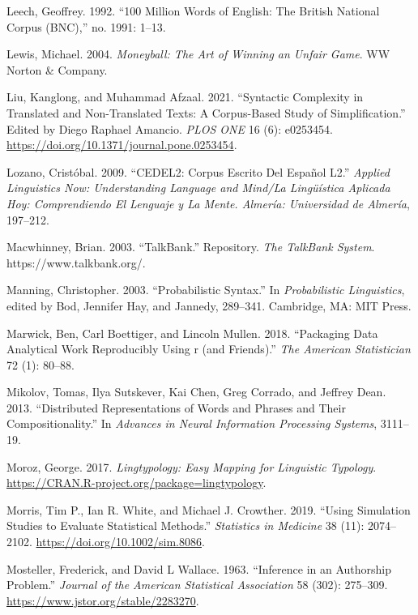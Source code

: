 \documentclass[
  letterpaper,
]{latex/krantz}
\newlength{\cslhangindent}
\newenvironment{CSLReferences}[2] %
 {\begin{list}{}{%
  \setlength{\itemindent}{0pt}
  \setlength{\leftmargin}{0pt}
  \setlength{\parsep}{0pt}
  \ifodd #1
   \setlength{\leftmargin}{\cslhangindent}
   \setlength{\itemindent}{-1\cslhangindent}
  \fi
  \setlength{\itemsep}{#2\baselineskip}}}
 {\end{list}}
\theoremstyle{definition}
\theoremstyle{remark}
\begin{document}
\begin{CSLReferences}{1}{0}
Leech, Geoffrey. 1992. {``100 Million Words of English: The British
National Corpus (BNC),''} no. 1991: 1--13.

Lewis, Michael. 2004. \emph{Moneyball: The Art of Winning an Unfair
Game}. WW Norton \& Company.

Liu, Kanglong, and Muhammad Afzaal. 2021. {``Syntactic Complexity in
Translated and Non-Translated Texts: A Corpus-Based Study of
Simplification.''} Edited by Diego Raphael Amancio. \emph{PLOS ONE} 16
(6): e0253454. \url{https://doi.org/10.1371/journal.pone.0253454}.

Lozano, Cristóbal. 2009. {``CEDEL2: Corpus Escrito Del Espa{ñ}ol L2.''}
\emph{Applied Linguistics Now: Understanding Language and Mind/La
Ling{ü}{í}stica Aplicada Hoy: Comprendiendo El Lenguaje y La Mente.
Almer{í}a: Universidad de Almer{í}a}, 197--212.

Macwhinney, Brian. 2003. {``TalkBank.''} Repository. \emph{The TalkBank
System}. https://www.talkbank.org/.

Manning, Christopher. 2003. {``Probabilistic Syntax.''} In
\emph{Probabilistic Linguistics}, edited by Bod, Jennifer Hay, and
Jannedy, 289--341. Cambridge, MA: MIT Press.

Marwick, Ben, Carl Boettiger, and Lincoln Mullen. 2018. {``Packaging
Data Analytical Work Reproducibly Using r (and Friends).''} \emph{The
American Statistician} 72 (1): 80--88.

Mikolov, Tomas, Ilya Sutskever, Kai Chen, Greg Corrado, and Jeffrey
Dean. 2013. {``Distributed Representations of Words and Phrases and
Their Compositionality.''} In \emph{Advances in Neural Information
Processing Systems}, 3111--19.

Moroz, George. 2017. \emph{Lingtypology: Easy Mapping for Linguistic
Typology}. \url{https://CRAN.R-project.org/package=lingtypology}.

Morris, Tim P., Ian R. White, and Michael J. Crowther. 2019. {``Using
Simulation Studies to Evaluate Statistical Methods.''} \emph{Statistics
in Medicine} 38 (11): 2074--2102.
\url{https://doi.org/10.1002/sim.8086}.

Mosteller, Frederick, and David L Wallace. 1963. {``Inference in an
Authorship Problem.''} \emph{Journal of the American Statistical
Association} 58 (302): 275--309.
\url{https://www.jstor.org/stable/2283270}.


\end{CSLReferences}
\end{document}
